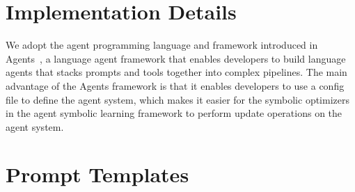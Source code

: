 \documentclass{article}
\newcommand{\baby}{agent symbolic learning\xspace}
\begin{document}
   




\newpage
\appendix
\section{Implementation Details}
We adopt the agent programming language and framework introduced in Agents~\citep{zhou2023agents}, a language agent framework that enables developers to build language agents that stacks prompts and tools together into complex pipelines. The main advantage of the Agents framework is that it enables developers to use a config file to define the agent system, which makes it easier for the symbolic optimizers in the \baby framework to perform update operations on the agent system.

\section{Prompt Templates}
\end{document}
